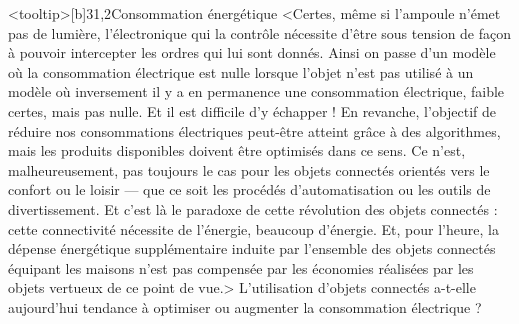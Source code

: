 \begin{quiz}[title={Informatique embarquée et objets connectés}]
\begin{quizquestion*}<tooltip>[b]{3}{1,2}{Consommation énergétique}
<Certes, même si l’ampoule n’émet pas de lumière, l’électronique qui la contrôle nécessite d’être sous tension de façon à pouvoir intercepter les ordres qui lui sont donnés. Ainsi on passe d’un modèle où la consommation électrique est nulle lorsque l’objet n’est pas utilisé à un modèle où inversement il y a en permanence une consommation électrique, faible certes, mais pas nulle. Et il est difficile d’y échapper !
En revanche, l'objectif de réduire nos consommations électriques peut-être atteint grâce à des algorithmes, mais les produits disponibles doivent être optimisés dans ce sens.
Ce n’est, malheureusement, pas toujours le cas pour les objets connectés orientés vers le confort ou le loisir --- que ce soit les procédés d’automatisation ou les outils de divertissement.
Et c’est là le paradoxe de cette révolution des objets connectés : cette connectivité nécessite de l’énergie, beaucoup d’énergie. Et, pour l’heure, la dépense énergétique supplémentaire induite par l’ensemble des objets connectés équipant les maisons n’est pas compensée par les économies réalisées par les objets vertueux de ce point de vue.>
L'utilisation d'objets connectés a-t-elle aujourd'hui tendance à optimiser ou augmenter la consommation électrique ? 
\end{quizquestion*}


\end{quiz}
